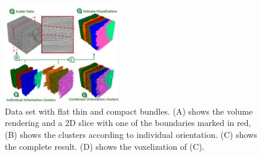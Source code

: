 \begin{figure}
\centering
	\includegraphics[width=0.45\textwidth]{imagesMT2014/crop-6.PNG}
	\caption{Data set with flat thin and compact bundles. (A) shows the volume rendering and a 2D slice with one of the boundaries marked in red, (B) shows the clusters according to individual orientation. (C) shows the complete result. (D) shows the voxelization of (C).}
	\label{fig:prepreg}
\end{figure}


